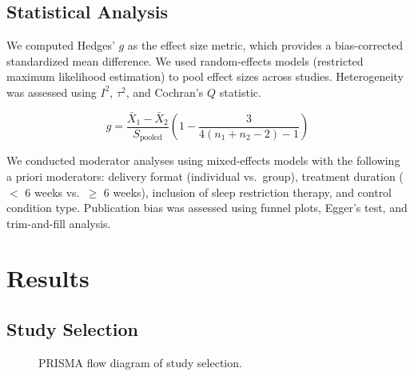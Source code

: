 \documentclass[
    language=english,
    doctype=meta-analysis,
    institution=none,
]{../../omnilatex}
\begin{document}
\subsection{Statistical Analysis}

We computed Hedges' $g$ as the effect size metric, which provides a bias-corrected
standardized mean difference. We used random-effects models (restricted maximum likelihood
estimation) to pool effect sizes across studies. Heterogeneity was assessed using $I^2$,
$\tau^2$, and Cochran's $Q$ statistic.

\begin{equation}
    \label{eq:effect-size}
    g = \frac{\bar{X}_1 - \bar{X}_2}{S_{\text{pooled}}} \left(1 - \frac{3}{4(n_1 + n_2 - 2) - 1}\right)
\end{equation}

We conducted moderator analyses using mixed-effects models with the following a priori
moderators: delivery format (individual vs.\ group), treatment duration ($<$ 6 weeks vs.\
$\geq$ 6 weeks), inclusion of sleep restriction therapy, and control condition type.
Publication bias was assessed using funnel plots, Egger's test, and trim-and-fill analysis.

\section{Results}
\label{sec:results}

\subsection{Study Selection}

\begin{figure}[htbp]
    \centering
    \caption{PRISMA flow diagram of study selection.}
    \label{fig:prisma}
\end{figure}
\end{document}
